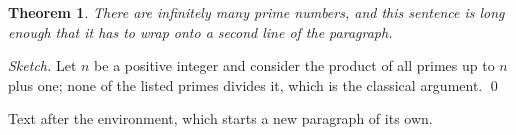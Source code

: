 \documentclass{article}
\newtheorem{theorem}{Theorem}
\begin{document}
\begin{theorem}
There are infinitely many prime numbers, and this sentence is long enough that it has to wrap onto a second line of the paragraph.
\end{theorem}
\noindent\textit{Sketch.} Let $n$ be a positive integer and consider the product of all primes up to $n$ plus one; none of the listed primes divides it, which is the classical argument. \qed

Text after the environment, which starts a new paragraph of its own.
\end{document}
